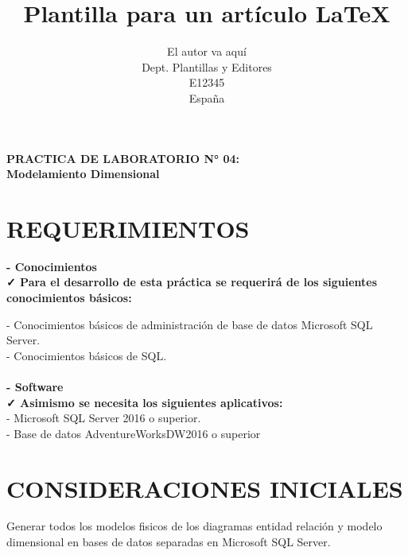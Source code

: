 %
%



\title{Plantilla para un artículo \LaTeX}
\author{El autor va aquí\\
  \small Dept. Plantillas y Editores\\
  \small E12345\\
  \small España
}



\begin{center}
\textbf{PRACTICA DE LABORATORIO N° 04:} \\
\textbf{Modelamiento Dimensional} \\
\end{center}

\section{REQUERIMIENTOS}

\textbf{- Conocimientos} \\
\textbf{✓ Para el desarrollo de esta práctica se requerirá de los siguientes conocimientos básicos:}
\item{- Conocimientos básicos de administración de base de datos Microsoft SQL Server.\\
- Conocimientos básicos de SQL.\\\\
\textbf{- Software} \\
\textbf{✓ Asimismo se necesita los siguientes aplicativos:} \\
- Microsoft SQL Server 2016 o superior.\\
- Base de datos AdventureWorksDW2016 o superior}

\section{CONSIDERACIONES INICIALES}
\item{Generar todos los modelos fisicos de los diagramas entidad relación y modelo dimensional en bases de datos separadas en Microsoft SQL Server.}

